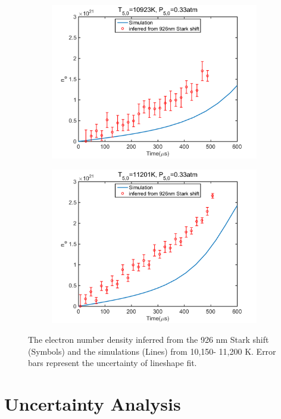 \documentclass[12pt]{iopart}
\begin{document}
\begin{figure}[h]
\begin{subfigure}[b]{0.4\textwidth}
     \includegraphics[width=\textwidth]{10923K_033atm_ne_sim_926.png}
      \caption{\label{fig:} }
      \end{subfigure}
        \begin{subfigure}[b]{0.4\textwidth}
     \includegraphics[width=\textwidth]{11201K_033atm_ne_sim_926.png}
      \caption{\label{fig:} }
      \end{subfigure}
    \caption{\label{fig:more_ne} The electron number density inferred from the 926 nm Stark shift (Symbols) and the simulations (Lines) from 10,150- 11,200 K.  Error bars represent the uncertainty of lineshape fit.}
\end{figure}

\section{Uncertainty Analysis}
\end{document}
